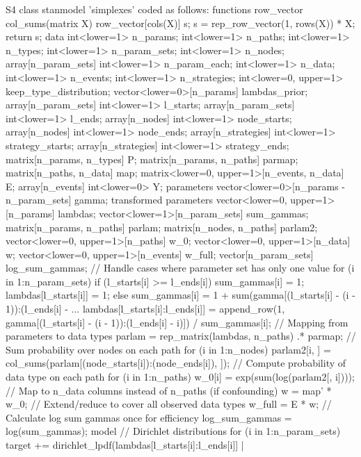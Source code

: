 \documentclass[
  11pt,
  article]{jss}
\begin{document}
\begin{CodeChunk}
\begin{CodeOutput}
S4 class stanmodel 'simplexes' coded as follows:
functions {
  row_vector col_sums(matrix X) {
    row_vector[cols(X)] s;
    s = rep_row_vector(1, rows(X)) * X;
    return s;
  }
}
data {
  int<lower=1> n_params;
  int<lower=1> n_paths;
  int<lower=1> n_types;
  int<lower=1> n_param_sets;
  int<lower=1> n_nodes;
  array[n_param_sets] int<lower=1> n_param_each;
  int<lower=1> n_data;
  int<lower=1> n_events;
  int<lower=1> n_strategies;
  int<lower=0, upper=1> keep_type_distribution;
  vector<lower=0>[n_params] lambdas_prior;
  array[n_param_sets] int<lower=1> l_starts;
  array[n_param_sets] int<lower=1> l_ends;
  array[n_nodes] int<lower=1> node_starts;
  array[n_nodes] int<lower=1> node_ends;
  array[n_strategies] int<lower=1> strategy_starts;
  array[n_strategies] int<lower=1> strategy_ends;
  matrix[n_params, n_types] P;
  matrix[n_params, n_paths] parmap;
  matrix[n_paths, n_data] map;
  matrix<lower=0, upper=1>[n_events, n_data] E;
  array[n_events] int<lower=0> Y;
}
parameters {
  vector<lower=0>[n_params - n_param_sets] gamma;
}
transformed parameters {
  vector<lower=0, upper=1>[n_params] lambdas;
  vector<lower=1>[n_param_sets] sum_gammas;
  matrix[n_params, n_paths] parlam;
  matrix[n_nodes, n_paths] parlam2;
  vector<lower=0, upper=1>[n_paths] w_0;
  vector<lower=0, upper=1>[n_data] w;
  vector<lower=0, upper=1>[n_events] w_full;
  vector[n_param_sets] log_sum_gammas;
  // Handle cases where parameter set has only one value
  for (i in 1:n_param_sets) {
    if (l_starts[i] >= l_ends[i]) {
      sum_gammas[i] = 1;
      lambdas[l_starts[i]] = 1;
    } else {
      sum_gammas[i] = 1 + sum(gamma[(l_starts[i] - (i - 1)):(l_ends[i] - ...
      lambdas[l_starts[i]:l_ends[i]] =
        append_row(1, gamma[(l_starts[i] - (i - 1)):(l_ends[i] - i)]) /
        sum_gammas[i];
    }
  }
  // Mapping from parameters to data types
  parlam = rep_matrix(lambdas, n_paths) .* parmap;
  // Sum probability over nodes on each path
  for (i in 1:n_nodes) {
    parlam2[i, ] = col_sums(parlam[(node_starts[i]):(node_ends[i]), ]);
  }
  // Compute probability of data type on each path
  for (i in 1:n_paths) {
    w_0[i] = exp(sum(log(parlam2[, i])));
  }
  // Map to n_data columns instead of n_paths (if confounding)
  w = map' * w_0;
  // Extend/reduce to cover all observed data types
  w_full = E * w;
  // Calculate log sum gammas once for efficiency
  log_sum_gammas = log(sum_gammas);
}
model {
  // Dirichlet distributions
  for (i in 1:n_param_sets) {
    target += dirichlet_lpdf(lambdas[l_starts[i]:l_ends[i]] |
}}
\end{CodeOutput}
\end{CodeChunk}
\end{document}
